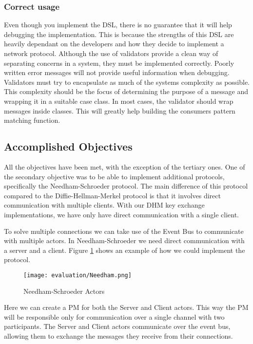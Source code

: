 \subsubsection{Correct usage}
Even though you implement the DSL, there is no guarantee that it will help debugging the implementation. This is because the strengths of this DSL are heavily dependant on the developers and how they decide to implement a network protocol. Although the use of validators provide a clean way of separating concerns in a system, they must be implemented correctly. Poorly written error messages will not provide useful information when debugging. Validators must try to encapsulate as much of the systems complexity as possible. This complexity should be the focus of determining the purpose of a message and wrapping it in a suitable case class. In most cases, the validator should wrap messages inside classes. This will greatly help building the consumers pattern matching function.


\subsection{Accomplished Objectives}
All the objectives have been met, with the exception of the tertiary ones. One of the secondary objective was to be able to implement additional protocols, specifically the Needham-Schroeder protocol. The main difference of this protocol compared to the Diffie-Hellman-Merkel protocol is that it involves direct communication with multiple clients. With our DHM key exchange implementations, we have only have direct communication with a single client.

To solve multiple connections we can take use of the Event Bus to communicate with multiple actors. In Needham-Schroeder we need direct communication with a server and a client. Figure \ref{fig:Needham} shows an example of how we could implement the protocol. 

\begin{figure}[H]
  \centering
  \texttt{[image: evaluation/Needham.png]}
  \caption{Needham-Schroeder Actors}
  \label{fig:Needham}
\end{figure}

Here we can create a PM for both the Server and Client actors. This way the PM will be responsible only for communication over a single channel with two participants. The Server and Client actors communicate over the event bus, allowing them to exchange the messages they receive from their connections.

